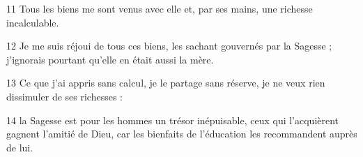 
11 Tous les biens me sont venus avec elle et, par ses mains, une richesse incalculable.

12 Je me suis réjoui de tous ces biens, les sachant gouvernés par la Sagesse ; j’ignorais pourtant qu’elle en était aussi la mère.

13 Ce que j’ai appris sans calcul, je le partage sans réserve, je ne veux rien dissimuler de ses richesses :

14 la Sagesse est pour les hommes un trésor inépuisable, ceux qui l’acquièrent gagnent l’amitié de Dieu, car les bienfaits de l’éducation les recommandent auprès de lui.